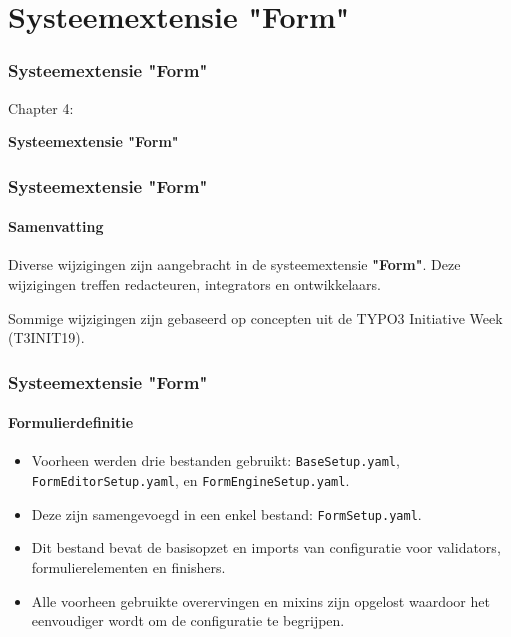 %

\section{Systeemextensie "Form"}
\begin{frame}[fragile]
	\frametitle{Systeemextensie "Form"}

	\begin{center}\huge{Chapter 4:}\end{center}
	\begin{center}\huge{\color{typo3darkgrey}\textbf{Systeemextensie "Form"}}\end{center}

\end{frame}


\begin{frame}[fragile]
	\frametitle{Systeemextensie "Form"}
	\framesubtitle{Samenvatting}

	\small
		Diverse wijzigingen zijn aangebracht in de systeemextensie \textbf{"Form"}.
		Deze wijzigingen treffen redacteuren, integrators en ontwikkelaars.

		\vspace{0.2cm}

		Sommige wijzigingen zijn gebaseerd op concepten uit de TYPO3 Initiative Week (T3INIT19).

	\normalsize

\end{frame}


\begin{frame}[fragile]
	\frametitle{Systeemextensie "Form"}
	\framesubtitle{Formulierdefinitie}

	\begin{itemize}
		\item Voorheen werden drie bestanden gebruikt: \texttt{BaseSetup.yaml}, \texttt{FormEditorSetup.yaml}, en \texttt{FormEngineSetup.yaml}.
		\item Deze zijn samengevoegd in een enkel bestand: \texttt{FormSetup.yaml}.
		\item Dit bestand bevat de basisopzet en imports van configuratie voor validators, formulierelementen en finishers.
		\item Alle voorheen gebruikte overervingen en mixins zijn opgelost waardoor het eenvoudiger wordt om de configuratie te begrijpen.
	\end{itemize}

\end{frame}

